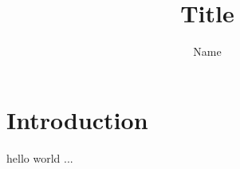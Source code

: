 \documentclass{article}
\title{Title}
\author{Name}
\begin{document}
\maketitle

\section{Introduction}
hello world ...
\end{document}
